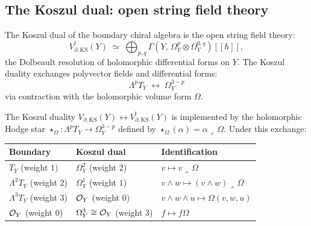 \subsection{The Koszul dual: open string field theory}

\begin{definition}
The Koszul dual of the boundary chiral algebra is the open string
field theory:
\begin{equation}%
V_{\partial,\mathrm{KS}}^!(Y)
\;\simeq\;
\bigoplus_{p,q}
\Gamma(Y,\,\Omega^p_Y\otimes\Omega^{0,q}_Y)[[\hbar]],
\end{equation}
the Dolbeault resolution of holomorphic differential forms on $Y$.
The Koszul duality exchanges polyvector fields and differential
forms:
\begin{equation}%
\Lambda^p T_Y \;\longleftrightarrow\; \Omega^{3-p}_Y
\end{equation}
via contraction with the holomorphic volume form $\Omega$.
\end{definition}

\begin{proposition}
The Koszul duality
$V_{\partial,\mathrm{KS}}(Y)\leftrightarrow
V_{\partial,\mathrm{KS}}^!(Y)$
is implemented by the holomorphic Hodge star
$\star_\Omega:\Lambda^p T_Y\to\Omega^{3-p}_Y$
defined by $\star_\Omega(\alpha)=\alpha\lrcorner\,\Omega$.
Under this exchange:
\begin{center}
\renewcommand{\arraystretch}{1.2}
\begin{tabular}{lll}
\textbf{Boundary} & \textbf{Koszul dual} & \textbf{Identification} \\
\hline
$T_Y$ (weight $1$) & $\Omega^2_Y$ (weight $2$) & $v\mapsto v\lrcorner\,\Omega$ \\
$\Lambda^2 T_Y$ (weight $2$) & $\Omega^1_Y$ (weight $1$) &
$v\wedge w\mapsto(v\wedge w)\lrcorner\,\Omega$ \\
$\Lambda^3 T_Y$ (weight $3$) & $\mathcal O_Y$ (weight $0$) &
$v\wedge w\wedge u\mapsto\Omega(v,w,u)$ \\
$\mathcal O_Y$ (weight $0$) & $\Omega^3_Y\cong\mathcal O_Y$ (weight $3$) &
$f\mapsto f\Omega$
\end{tabular}
\end{center}
\end{proposition}

